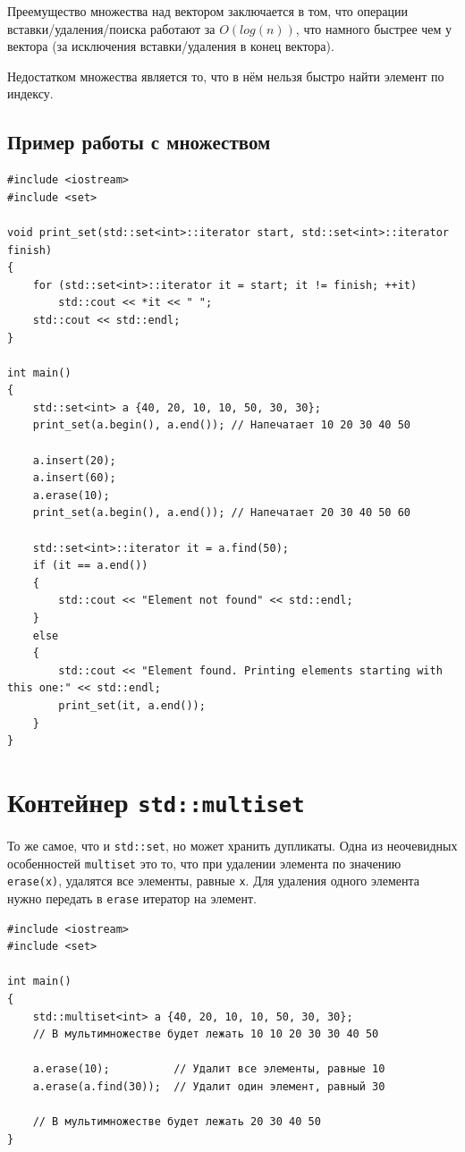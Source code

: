 \documentclass{article}
\begin{document}
Преемущество множества над вектором заключается в том, что операции вставки/удаления/поиска работают за $O(log(n))$, что намного быстрее чем у вектора (за исключения вставки/удаления в конец вектора).

Недостатком множества является то, что в нём нельзя быстро найти элемент по индексу.




\newpage
\subsection*{Пример работы с множеством}

\begin{lstlisting}
#include <iostream>
#include <set>

void print_set(std::set<int>::iterator start, std::set<int>::iterator finish)
{
    for (std::set<int>::iterator it = start; it != finish; ++it)
        std::cout << *it << " ";
    std::cout << std::endl;
}

int main()
{
    std::set<int> a {40, 20, 10, 10, 50, 30, 30}; 
    print_set(a.begin(), a.end()); // Напечатает 10 20 30 40 50
    
    a.insert(20);
    a.insert(60);
    a.erase(10);
    print_set(a.begin(), a.end()); // Напечатает 20 30 40 50 60
    
    std::set<int>::iterator it = a.find(50);
    if (it == a.end())
    {
        std::cout << "Element not found" << std::endl;
    }
    else
    {
        std::cout << "Element found. Printing elements starting with this one:" << std::endl;
        print_set(it, a.end());
    }
}
\end{lstlisting}





\section*{Контейнер \texttt{std::multiset}}
То же самое, что и \texttt{std::set}, но может хранить дупликаты. Одна из неочевидных особенностей \texttt{multiset} это то, что при удалении элемента по значению \texttt{erase(x)}, удалятся все элементы, равные \texttt{x}. Для удаления одного элемента нужно передать в \texttt{erase} итератор на элемент.

\begin{lstlisting}
#include <iostream>
#include <set>

int main()
{
    std::multiset<int> a {40, 20, 10, 10, 50, 30, 30};  
    // В мультимножестве будет лежать 10 10 20 30 30 40 50
    
    a.erase(10);          // Удалит все элементы, равные 10
    a.erase(a.find(30));  // Удалит один элемент, равный 30
    
    // В мультимножестве будет лежать 20 30 40 50
}
\end{lstlisting}
\end{document}
